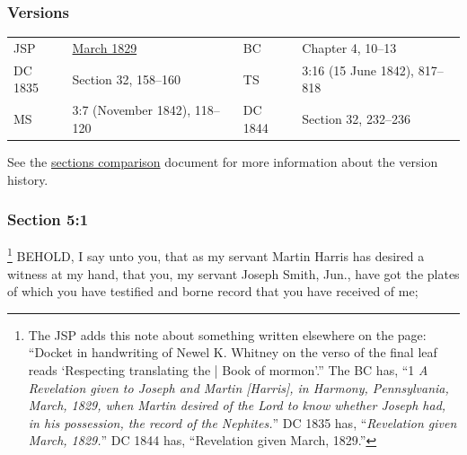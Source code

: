	\subsubsection{Versions}
		\label{DC5-V}
	
		\begin{tabular}{p{1in}p{2in}p{1in}p{2in}}
			JSP		& \hyperref[EMS-1828-1829-JS-MAR-1829]{March 1829}	& BC	& Chapter 4, 10--13 \\
			DC 1835	& Section 32, 158--160								& TS	& 3:16 (15 June 1842), 817--818 \\
			MS		& 3:7 (November 1842), 118--120						& DC 1844 & Section 32, 232--236 \\
		\end{tabular}
		
		\medskip
	
		See the \href{https://drive.google.com/file/d/1goAvNz8jS4R8slYfMG_db55Ty2z_vmgK/view?usp=sharing}{sections comparison} document for more information about the version history.

	\subsubsection{Section 5:1} %
		\label{DC5-1}

			\footnote{%
				The JSP adds this note about something written elsewhere on the page: ``Docket in handwriting of Newel K. Whitney on the verso of the final leaf reads `Respecting translating the | Book of mormon'.'' The BC has, ``1 \textit{A Revelation given to Joseph and Martin [Harris], in Harmony, Pennsylvania, March, 1829, when Martin desired of the Lord to know whether Joseph had, in his possession, the record of the Nephites.}'' DC 1835 has, ``\textit{Revelation given March, 1829.}'' DC 1844 has, ``Revelation given March, 1829.''
				}%
		BEHOLD, I say unto you, that as my servant Martin Harris has desired a witness at my hand, that you, my servant Joseph Smith, Jun., have got the plates of which you have testified and borne record that you have received of me;

